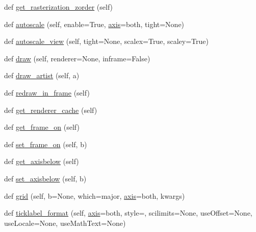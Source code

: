 \begin{DoxyCompactItemize}
def \hyperlink{classmatplotlib_1_1axes_1_1__base_1_1__AxesBase_a334a07121fde9d9fefe46aeb4720a4e1}{get\+\_\+rasterization\+\_\+zorder} (self)
\item 
def \hyperlink{classmatplotlib_1_1axes_1_1__base_1_1__AxesBase_a2027efcd4dfcbd74407ab0fa7dacc223}{autoscale} (self, enable=True, \hyperlink{classmatplotlib_1_1axes_1_1__base_1_1__AxesBase_a9c63db539d7ab6bcb071919bdfd8af8f}{axis}=\textquotesingle{}both\textquotesingle{}, tight=None)
\item 
def \hyperlink{classmatplotlib_1_1axes_1_1__base_1_1__AxesBase_a17efd4daf13c9bd629b2896cc9a7e9b0}{autoscale\+\_\+view} (self, tight=None, scalex=True, scaley=True)
\item 
def \hyperlink{classmatplotlib_1_1axes_1_1__base_1_1__AxesBase_a17c358afc5008f7677a753b2b1e72741}{draw} (self, renderer=None, inframe=False)
\item 
def \hyperlink{classmatplotlib_1_1axes_1_1__base_1_1__AxesBase_a9ea12104cfe6330a2531d37a41dab4eb}{draw\+\_\+artist} (self, a)
\item 
def \hyperlink{classmatplotlib_1_1axes_1_1__base_1_1__AxesBase_aba58f227e565c6ce9160e1b3de48f049}{redraw\+\_\+in\+\_\+frame} (self)
\item 
def \hyperlink{classmatplotlib_1_1axes_1_1__base_1_1__AxesBase_ad9133e96c036cb61e9036480b9650dca}{get\+\_\+renderer\+\_\+cache} (self)
\item 
def \hyperlink{classmatplotlib_1_1axes_1_1__base_1_1__AxesBase_a6470edf020a76dc41aac24a1c6640546}{get\+\_\+frame\+\_\+on} (self)
\item 
def \hyperlink{classmatplotlib_1_1axes_1_1__base_1_1__AxesBase_a5d231d36f3cb07db8c340904715a50ec}{set\+\_\+frame\+\_\+on} (self, b)
\item 
def \hyperlink{classmatplotlib_1_1axes_1_1__base_1_1__AxesBase_acd035d316eb4edc0342c39f57b158a08}{get\+\_\+axisbelow} (self)
\item 
def \hyperlink{classmatplotlib_1_1axes_1_1__base_1_1__AxesBase_a086e2fcd9c7922cbc23ab81ede70f627}{set\+\_\+axisbelow} (self, b)
\item 
def \hyperlink{classmatplotlib_1_1axes_1_1__base_1_1__AxesBase_aadaa6527c7642ea25841d7f7a12bc899}{grid} (self, b=None, which=\textquotesingle{}major\textquotesingle{}, \hyperlink{classmatplotlib_1_1axes_1_1__base_1_1__AxesBase_a9c63db539d7ab6bcb071919bdfd8af8f}{axis}=\textquotesingle{}both\textquotesingle{}, kwargs)
\item 
def \hyperlink{classmatplotlib_1_1axes_1_1__base_1_1__AxesBase_a62e28856d1bc2662e2d2a292d445b1b3}{ticklabel\+\_\+format} (self, \hyperlink{classmatplotlib_1_1axes_1_1__base_1_1__AxesBase_a9c63db539d7ab6bcb071919bdfd8af8f}{axis}=\textquotesingle{}both\textquotesingle{}, style=\textquotesingle{}\textquotesingle{}, scilimits=None, use\+Offset=None, use\+Locale=None, use\+Math\+Text=None)

\end{DoxyCompactItemize}
